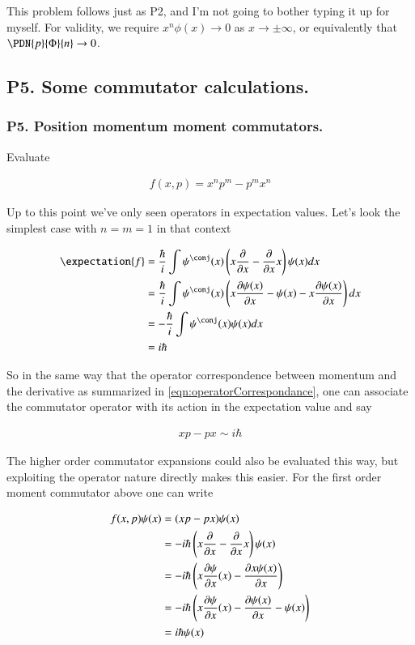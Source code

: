 This problem follows just as P2, and I'm not going to bother typing it up for myself.  For validity, we require
$x^n \phi(x) \rightarrow 0$ as $x \rightarrow \pm \infty$, or equivalently that $\PDN{p}{\Phi}{n} \rightarrow 0$.

\subsection{P5. Some commutator calculations. }

\subsubsection{P5. Position momentum moment commutators. }

Evaluate

\begin{align*}
f(x,p) = x^n p^m - p^m x^n
\end{align*}

Up to this point we've only seen operators in expectation values.  Let's look the simplest case with $n = m = 1$ in that
context

\begin{align*}
\expectation{f} 
&= \frac{\hbar}{i} \int \psi^\conj(x) \left(x \PD{x}{} - \PD{x}{} x \right) \psi(x) dx \\
&= \frac{\hbar}{i} \int \psi^\conj(x) \left(x \PD{x}{\psi(x)} - \psi(x) - x \PD{x}{\psi(x)} \right) dx \\
&= -\frac{\hbar}{i} \int \psi^\conj(x) \psi(x) dx \\
&= {i\hbar}
\end{align*}

So in the same way that the operator correspondence between momentum and the derivative as summarized in 
\ref{eqn:operatorCorrespondance}, one can associate the commutator operator with its action in the expectation value and
say

\begin{align}\label{eqn:commutator}
x p - p x \sim  i\hbar
\end{align}

The higher order commutator expansions could also be evaluated this way, but exploiting the operator nature directly 
makes this easier.  For the first order moment commutator above one can write

\begin{align*}
f(x,p) \psi(x) 
&= (x p - p x) \psi(x) \\
&= -i \hbar \left(x \PD{x}{} - \PD{x}{} x\right) \psi(x) \\
&= -i \hbar \left(x \PD{x}{\psi}(x) - \PD{x}{x \psi(x)} \right) \\
&= -i \hbar \left(x \PD{x}{\psi}(x) - \PD{x}{\psi(x)} -\psi(x) \right) \\
&= i \hbar \psi(x) \\
\end{align*}

